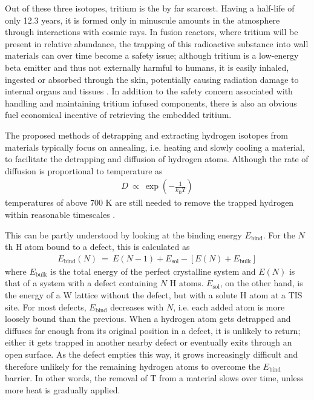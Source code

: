 Out of these three isotopes, tritium is the by far scarcest. 
Having a half-life of only 12.3 years, it is formed only in minuscule amounts in the atmosphere through interactions with cosmic rays.
In fusion reactors, where tritium will be present in relative abundance, the trapping of this radioactive substance into wall materials can over time become a safety issue; although tritium is a low-energy beta emitter and thus not externally harmful to humans, it is easily inhaled, ingested or absorbed through the skin, potentially causing radiation damage to internal organs and tissues \cite{tritiumHealth}.
In addition to the safety concern associated with handling and maintaining tritium infused components, there is also an obvious fuel economical incentive of retrieving the embedded tritium.

The proposed methods of detrapping and extracting hydrogen isotopes from materials typically focus on annealing, i.e. heating and slowly cooling a material, to facilitate the detrapping and diffusion of hydrogen atoms. 
Although the rate of diffusion is proportional to temperature as
\begin{align}
D ~\propto~ \exp\left(-\frac{1}{k_{\text{B}}T}\right)
\end{align}
temperatures of above 700 K are still needed to remove the trapped hydrogen within reasonable timescales \cite{heinola2017long}.

This can be partly understood by looking at the binding energy $E_{\text{bind}}$. For the $N$th H atom bound to a defect, this is calculated as
\begin{align}
E_{\text{bind}}(N) ~=~ E(N-1) + E_\text{sol} - [ E(N) + E_\text{bulk} ]
\end{align}
where $E_\text{bulk}$ is the total energy of the perfect crystalline system and $E(N)$ is that of a system with a defect containing $N$ H atoms. 
$E_\text{sol}$, on the other hand, is the energy of a W lattice without the defect, but with a solute H atom at a TIS site.
For most defects, $E_{\text{bind}}$ decreases with $N$, i.e. each added atom is more loosely bound than the previous.
When a hydrogen atom gets detrapped and diffuses far enough from its original position in a defect, it is unlikely to return; either it gets trapped in another nearby defect or eventually exits through an open surface.
As the defect empties this way, it grows increasingly difficult and therefore unlikely for the remaining hydrogen atoms to overcome the $E_{\text{bind}}$ barrier.
In other words, the removal of T from a material slows over time, unless more heat is gradually applied.

